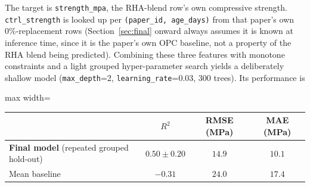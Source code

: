 \documentclass[11pt]{article}
\newcommand{\R}{$R^2$}
\begin{document}
\noindent The target is \texttt{strength\_mpa}, the RHA-blend row's own compressive
strength. \texttt{ctrl\_strength} is looked up per \texttt{(paper\_id, age\_days)} from
that paper's own 0\%-replacement rows (Section~\ref{sec:final} onward always assumes it
is known at inference time, since it is the paper's own OPC baseline, not a property of
the RHA blend being predicted). Combining these three features with monotone
constraints and a light grouped hyper-parameter search yields a deliberately shallow
model (\texttt{max\_depth}=2, \texttt{learning\_rate}=0.03, 300 trees). Its performance
is
\begin{center}\small
\begin{adjustbox}{max width=\linewidth}
\begin{tabular}{lccc}
\toprule
 & \R{} & RMSE (MPa) & MAE (MPa) \\
\midrule
\textbf{Final model} (repeated grouped hold-out) & $\mathbf{0.50\pm0.20}$ & $\mathbf{14.9}$ & $\mathbf{10.1}$ \\
Mean baseline & $-0.31$ & $24.0$ & $17.4$ \\
\bottomrule
\end{tabular}
\end{adjustbox}
\end{center}
\end{document}
